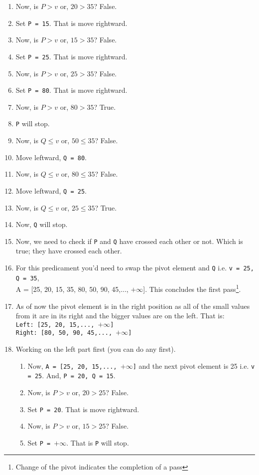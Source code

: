 \documentclass[a4paper,12pt]{article}
\theoremstyle{definition}
\begin{document}
\begin{enumerate}
        \item Now, is $P > v$ or, $20 > 35$? False.
        \item Set \texttt{P = 15}. That is move rightward.
        \item Now, is $P > v$ or, $15 > 35$? False.
        \item Set \texttt{P = 25}. That is move rightward.
        \item Now, is $P > v$ or, $25 > 35$? False.
        \item Set \texttt{P = 80}. That is move rightward.
        \item Now, is $P > v$ or, $80 > 35$? True.
        \item \texttt{P} will stop.
        \item Now, is $Q \leq v$ or, $50 \leq 35$? False.
        \item Move leftward, \texttt{Q = 80}.
        \item Now, is $Q \leq v$ or, $80 \leq 35$? False.
        \item Move leftward, \texttt{Q = 25}.
        \item Now, is $Q \leq v$ or, $25 \leq 35$? True.
        \item Now, \texttt{Q} will stop.
        \item Now, we need to check if \texttt{P} and \texttt{Q} have crossed each other or not.
        Which is true; they have crossed each other.
        \item For this predicament you'd need to swap the pivot element and \texttt{Q} i.e. \texttt{v = 25, Q = 35},\\
        A = [25, 20, 15, 35, 80, 50, 90, 45,..., $+\infty$].
        This concludes the first pass\footnote{Change of the pivot indicates the completion of a pass}.
        \item As of now the pivot element is in the right position as all of the small values from it are in its
        right and the bigger values are on the left. That is:\\ \texttt{Left: [25, 20, 15,..., $+\infty$]}\\
        \texttt{Right: [80, 50, 90, 45,..., $+\infty$]}

        \item Working on the left part first (you can do any first).
        \begin{enumerate}
            \item Now, \texttt{A = [25, 20, 15,..., $+\infty$]} and the next pivot element is 25 i.e. \texttt{v = 25}.
            And, \texttt{P = 20, Q = 15}.
            \item Now, is $P > v$ or, $20 > 25$? False.
            \item Set \texttt{P = 20}. That is move rightward.
            \item Now, is $P > v$ or, $15 > 25$? False.
            \item Set \texttt{P = $+\infty$}. That is \texttt{P} will stop.


\end{enumerate}
\end{enumerate}
\end{document}
